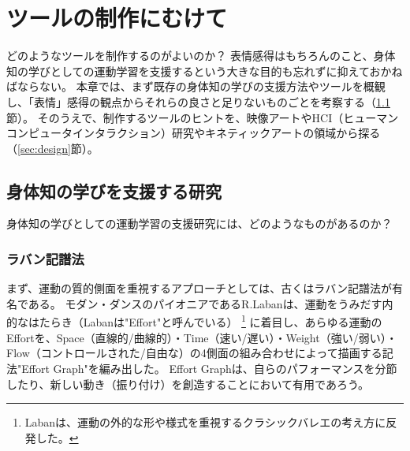 
\chapter{ツールの制作にむけて}
\label{chapter:fortoolmaking}
どのようなツールを制作するのがよいのか？
表情感得はもちろんのこと、身体知の学びとしての運動学習を支援するという大きな目的も忘れずに抑えておかねばならない。
本章では、まず既存の身体知の学びの支援方法やツールを概観し、「表情」感得の観点からそれらの良さと足りないものごとを考察する（\ref{sec:support_embodied_learning}節）。
そのうえで、制作するツールのヒントを、映像アートやHCI（ヒューマンコンピュータインタラクション）研究やキネティックアートの領域から探る（\ref{sec:design}節）。

\section{身体知の学びを支援する研究}
\label{sec:support_embodied_learning}

身体知の学びとしての運動学習の支援研究には、どのようなものがあるのか？

\subsection{ラバン記譜法}
まず、運動の質的側面を重視するアプローチとしては、古くはラバン記譜法\cite{laban:1971}が有名である。
モダン・ダンスのパイオニアであるR.Laban\cite{laban:1971}は、運動をうみだす内的なはたらき（Labanは"Effort"と呼んでいる）
\footnote{Labanは、運動の外的な形や様式を重視するクラシックバレエの考え方に反発した。}
に着目し、あらゆる運動のEffortを、Space（直線的/曲線的）・Time（速い/遅い）・Weight（強い/弱い）・Flow（コントロールされた/自由な）の4側面の組み合わせによって描画する記法"Effort Graph"を編み出した。
Effort Graphは、自らのパフォーマンスを分節したり、新しい動き（振り付け）を創造することにおいて有用であろう。

